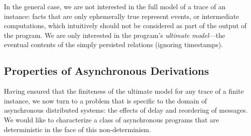In the general case, we are not interested in the full model of a trace of an
instance: facts that are only ephemerally true represent events, or intermediate
computations, which intuitively should not be considered as part of the output
of the program.  We are only interested in the program's {\em ultimate
  model}---the eventual contents of the simply persisted relations (ignoring
timestamps).

%
%




\subsection{Properties of Asynchronous Derivations}

Having ensured that the finiteness of the ultimate model for any trace of a
finite \lang instance, we now turn to a problem that is specific to the domain
of asynchronous distributed systems: the effects of delay
and reordering of messages. We would like to characterize a class of
asynchronous \lang programs that are deterministic in the face of this
non-determinism.

